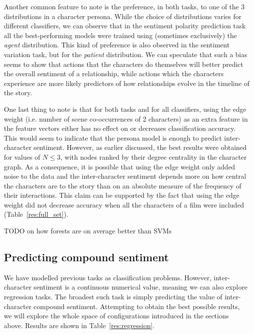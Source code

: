 \documentclass[bsc,frontabs,singlespacing,parskip, twoside]{infthesis}
\begin{document}
Another common feature to note is the preference, in both tasks, to one of the 3 distributions in a character persona. While the choice of distributions varies for different classifiers, we can observe that in the sentiment polarity prediction task all the best-performing models were trained using (sometimes exclusively) the \textit{agent} distribution. This kind of preference is also observed in the sentiment variation task, but for the \textit{patient} distribution. We can speculate that such a bias seems to show that actions that the characters do themselves will better predict the overall sentiment of a relationship, while actions which the characters experience are more likely predictors of how relationships evolve in the timeline of the story.

One last thing to note is that for both tasks and for all classifiers, using the edge weight (i.e. number of scene co-occurrences of 2 characters) as an extra feature in the feature vectors either has no effect on or decreases classification accuracy. This would seem to indicate that the persona model is enough to predict inter-character sentiment. However, as earlier discussed, the best results were obtained for values of $N \le 3$, with nodes ranked by their degree centrality in the character graph. As a consequence, it is possible that using the edge weight only added noise to the data and the inter-character sentiment depends more on how central the characters are to the story than on an absolute measure of the frequency of their interactions. This claim can be supported by the fact that using the edge weight did not decrease accuracy when all the characters of a film were included (Table~\ref{res:full_set}).

TODO \cite{caruana2006} on how forests are on average better than SVMs

\subsection{Predicting compound sentiment}
We have modelled previous tasks as classification problems. However, inter-character sentiment is a continuous numerical value, meaning we can also explore regression tasks. The broadest such task is simply predicting the value of inter-character compound sentiment. Attempting to obtain the best possible results, we will explore the whole space of configurations introduced in the sections above. Results are shown in Table~\ref{res:regression}. 
\end{document}
